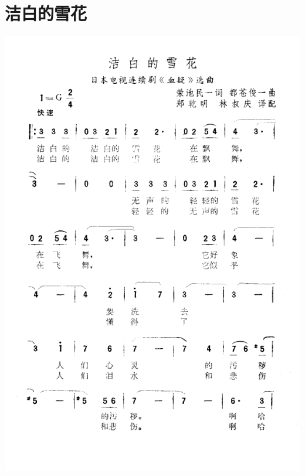 \documentclass[cn,pad,chinese,chinesefont=nofont]{elegantbook}
\begin{document}
\section{洁白的雪花}
    \includegraphics[height=\textheight]{dongxiao/日本-洁白的雪花.png}
\end{document}

